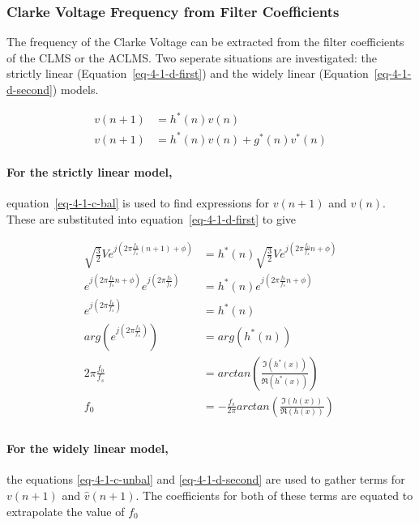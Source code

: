 \documentclass[main.tex]{subfiles}
\begin{document}
\subsubsection{Clarke Voltage Frequency from Filter Coefficients}


The frequency of the Clarke Voltage can be extracted from the filter coefficients of the CLMS or the ACLMS. Two seperate situations are investigated: the strictly linear (Equation~\ref{eq-4-1-d-first}) and the widely linear (Equation~\ref{eq-4-1-d-second}) models.

\begin{align}
v(n+1) &= h^*(n)v(n) \label{eq-4-1-d-first}\\
v(n+1) &= h^*(n)v(n) + g^*(n)v^*(n) \label{eq-4-1-d-second}
\end{align}

\paragraph{For the strictly linear model,} equation~\ref{eq-4-1-c-bal} is used to find expressions for $v(n+1)$ and $v(n)$. These are substituted into equation~\ref{eq-4-1-d-first} to give

\begin{align*}
\sqrt{\frac{3}{2}} V e^{j(2 \pi \frac{f_0}{f_s}(n+1) + \phi)} &= h^*(n)\sqrt{\frac{3}{2}} V e^{j(2 \pi \frac{f_0}{f_s}n + \phi)}\\
e^{j(2 \pi \frac{f_0}{f_s}n + \phi)}e^{j(2 \pi \frac{f_0}{f_s})} &= h^*(n) e^{j(2 \pi \frac{f_0}{f_s}n + \phi)}\\
e^{j(2 \pi \frac{f_0}{f_s})} &= h^*(n) \\
arg(e^{j(2 \pi \frac{f_0}{f_s})}) &= arg(h^*(n)) \\
2 \pi \frac{f_0}{f_s} &= arctan\left(\frac{\Im(h^*(x))}{\Re(h^*(x))}\right) \\
f_0 &= - \frac{f_s}{2\pi} arctan\left(\frac{\Im(h(x))}{\Re(h(x))}\right) \\
\end{align*}

\paragraph{For the widely linear model,} the equations \ref{eq-4-1-c-unbal} and \ref{eq-4-1-d-second} are used to gather terms for $v(n+1)$ and $\hat{v}(n+1)$. The coefficients for both of these terms are equated to extrapolate the value of $f_0$ %
\end{document}
